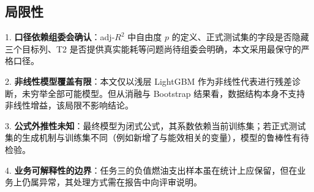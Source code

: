 \subsection{局限性}

1. \textbf{口径依赖组委会确认}：adj-$R^2$ 中自由度 $p$ 的定义、正式测试集的字段是否隐藏三个目标列、T2 是否提供真实能耗等问题尚待组委会明确，本文采用最保守的严格口径。

2. \textbf{非线性模型覆盖有限}：本文仅以浅层 LightGBM 作为非线性代表进行残差诊断，未穷举全部可能模型。但从消融与 Bootstrap 结果看，数据结构本身不支持非线性增益，该局限不影响结论。

3. \textbf{公式外推性未知}：最终模型为闭式公式，其系数依赖当前训练集；若正式测试集的生成机制与训练集不同（例如新增了与能效相关的变量），模型的鲁棒性有待检验。

4. \textbf{业务可解释性的边界}：任务三的负值燃油支出样本虽在统计上应保留，但在业务上仍属异常，其处理方式需在报告中向评审说明。
